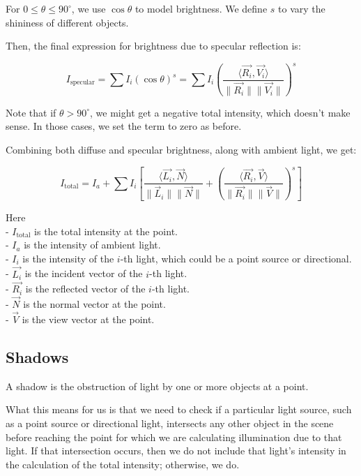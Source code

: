 \documentclass[conference]{IEEEtran}
\begin{document}
For $0 \leq \theta \leq 90^\circ$, we use $\cos \theta$ to model brightness. We define $s$ to vary the shininess of different objects.

Then, the final expression for brightness due to specular reflection is:

\begin{equation}
    I_{\text{specular}} = \sum I_i (\cos \theta)^s = \sum I_i \left( \frac{\langle \vec{R_i}, \vec{V_i} \rangle}{\|\vec{R_i}\| \|\vec{V_i}\|} \right)^s
    \label{specular}
\end{equation}

Note that if $\theta > 90^\circ$, we might get a negative total intensity, which doesn't make sense. In those cases, we set the term to zero as before.

Combining both diffuse and specular brightness, along with ambient light, we get:

\begin{equation}
    {I_{\text{total}} = I_a + \sum I_i \left[ \frac{\langle \vec{L_i}, \vec{N} \rangle}{\|\vec{L}_i\| \|\vec{N}\|} + \left( \frac{\langle \vec{R_i}, \vec{V} \rangle}{\|\vec{R_i}\| \|\vec{V}\|} \right)^s \right]}
    \label{combined}
\end{equation}

Here\\
- $I_{\text{total}}$ is the total intensity at the point.\\
- $I_a$ is the intensity of ambient light.\\
- $I_i$ is the intensity of the $i$-th light, which could be a point source or directional.\\
- $\vec{L_i}$ is the incident vector of the $i$-th light.\\
- $\vec{R_i}$ is the reflected vector of the $i$-th light.\\
- $\vec{N}$ is the normal vector at the point.\\
- $\vec{V}$ is the view vector at the point.\\

\subsection{Shadows }

A shadow is the obstruction of light by one or more objects at a point.

What this means for us is that we need to check if a particular light source, such as a point source or directional light, intersects any other object in the scene before reaching the point for which we are calculating illumination due to that light. If that intersection occurs, then we do not include that light's intensity in the calculation of the total intensity; otherwise, we do.
\end{document}

